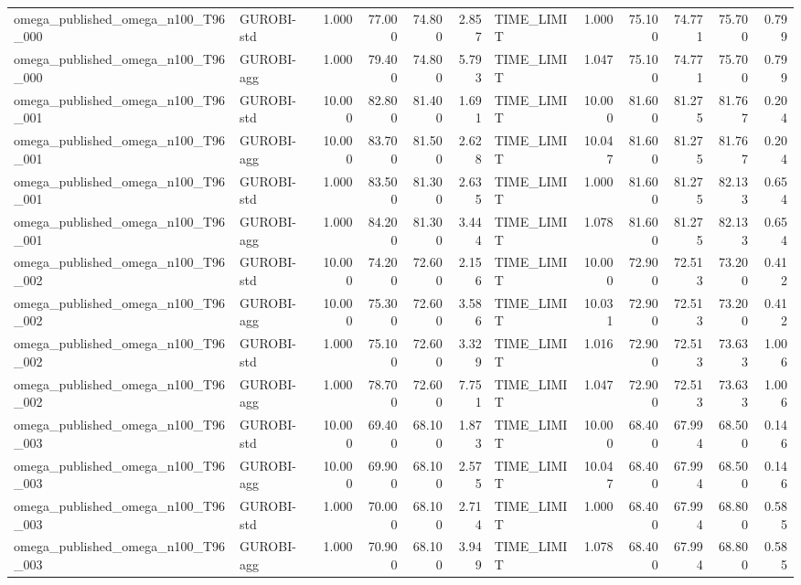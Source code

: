\begin{table}[htbp]
\begin{tabular}{llrrrrlrrrrr}
omega\_published\_omega\_n100\_T96\_000 & GUROBI-std & 1.000 & 77.000 & 74.800 & 2.857 & TIME\_LIMIT & 1.000 & 75.100 & 74.771 & 75.700 & 0.799 \\
omega\_published\_omega\_n100\_T96\_000 & GUROBI-agg & 1.000 & 79.400 & 74.800 & 5.793 & TIME\_LIMIT & 1.047 & 75.100 & 74.771 & 75.700 & 0.799 \\
omega\_published\_omega\_n100\_T96\_001 & GUROBI-std & 10.000 & 82.800 & 81.400 & 1.691 & TIME\_LIMIT & 10.000 & 81.600 & 81.275 & 81.767 & 0.204 \\
omega\_published\_omega\_n100\_T96\_001 & GUROBI-agg & 10.000 & 83.700 & 81.500 & 2.628 & TIME\_LIMIT & 10.047 & 81.600 & 81.275 & 81.767 & 0.204 \\
omega\_published\_omega\_n100\_T96\_001 & GUROBI-std & 1.000 & 83.500 & 81.300 & 2.635 & TIME\_LIMIT & 1.000 & 81.600 & 81.275 & 82.133 & 0.654 \\
omega\_published\_omega\_n100\_T96\_001 & GUROBI-agg & 1.000 & 84.200 & 81.300 & 3.444 & TIME\_LIMIT & 1.078 & 81.600 & 81.275 & 82.133 & 0.654 \\
omega\_published\_omega\_n100\_T96\_002 & GUROBI-std & 10.000 & 74.200 & 72.600 & 2.156 & TIME\_LIMIT & 10.000 & 72.900 & 72.513 & 73.200 & 0.412 \\
omega\_published\_omega\_n100\_T96\_002 & GUROBI-agg & 10.000 & 75.300 & 72.600 & 3.586 & TIME\_LIMIT & 10.031 & 72.900 & 72.513 & 73.200 & 0.412 \\
omega\_published\_omega\_n100\_T96\_002 & GUROBI-std & 1.000 & 75.100 & 72.600 & 3.329 & TIME\_LIMIT & 1.016 & 72.900 & 72.513 & 73.633 & 1.006 \\
omega\_published\_omega\_n100\_T96\_002 & GUROBI-agg & 1.000 & 78.700 & 72.600 & 7.751 & TIME\_LIMIT & 1.047 & 72.900 & 72.513 & 73.633 & 1.006 \\
omega\_published\_omega\_n100\_T96\_003 & GUROBI-std & 10.000 & 69.400 & 68.100 & 1.873 & TIME\_LIMIT & 10.000 & 68.400 & 67.994 & 68.500 & 0.146 \\
omega\_published\_omega\_n100\_T96\_003 & GUROBI-agg & 10.000 & 69.900 & 68.100 & 2.575 & TIME\_LIMIT & 10.047 & 68.400 & 67.994 & 68.500 & 0.146 \\
omega\_published\_omega\_n100\_T96\_003 & GUROBI-std & 1.000 & 70.000 & 68.100 & 2.714 & TIME\_LIMIT & 1.000 & 68.400 & 67.994 & 68.800 & 0.585 \\
omega\_published\_omega\_n100\_T96\_003 & GUROBI-agg & 1.000 & 70.900 & 68.100 & 3.949 & TIME\_LIMIT & 1.078 & 68.400 & 67.994 & 68.800 & 0.585 \\

\end{tabular}
\end{table}
